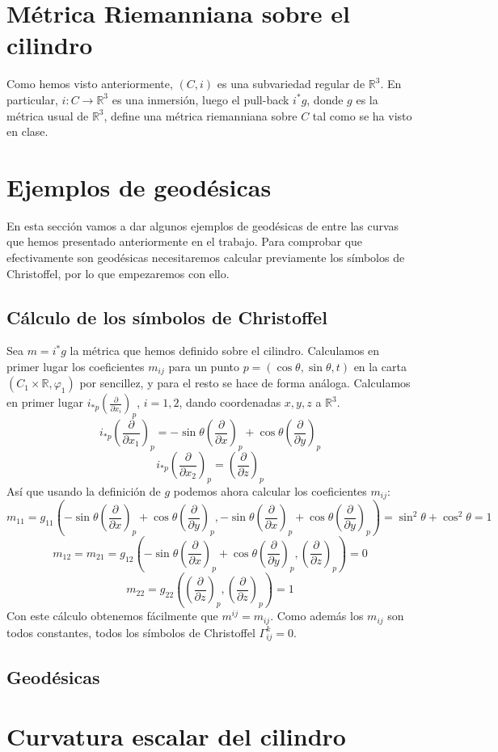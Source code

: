 \documentclass[twoside, 11pt]{article}
\theoremstyle{definition}
\newcommand{\R}{\mathbb{R}}
\newcommand{\parcial}[2]{\frac{\partial #1}{\partial #2}}
\begin{document}
\section{Métrica Riemanniana sobre el cilindro}

Como hemos visto anteriormente, $(C,i)$ es una subvariedad regular de $\R^3$. En particular, $i:C\to \R^3$ es una inmersión, luego el pull-back $i^*g$, donde $g$ es la métrica usual de $\R^3$, define una métrica riemanniana sobre $C$ tal como se ha visto en clase.


\section{Ejemplos de geodésicas}
En esta sección vamos a dar algunos ejemplos de geodésicas de entre las curvas que hemos presentado anteriormente en el trabajo. Para comprobar que efectivamente son geodésicas necesitaremos calcular previamente los símbolos de Christoffel, por lo que empezaremos con ello.

\subsection{Cálculo de los símbolos de Christoffel}
Sea $m=i^*g$ la métrica que hemos definido sobre el cilindro. Calculamos en primer lugar los coeficientes $m_{ij}$ para un punto $p=(\cos\theta,\sin\theta, t)$ en la carta $(C_1\times\R,\varphi_1)$ por sencillez, y para el resto se hace de forma análoga. Calculamos en primer lugar $i_{*p}\left(\parcial{}{x_i}\right)_p$, $i=1,2$, dando coordenadas $x,y,z$ a $\R^3$.
\[
i_{*p}\left(\parcial{}{x_1}\right)_p= -\sin\theta \left(\parcial{}{x}\right)_p+\cos\theta\left(\parcial{}{y}\right)_p
\]
\[
i_{*p}\left(\parcial{}{x_2}\right)_p= \left(\parcial{}{z}\right)_p
\]
Así que usando la definición de $g$ podemos ahora calcular los coeficientes $m_{ij}$:
\[
m_{11}=g_{11}\left(-\sin\theta \left(\parcial{}{x}\right)_p+\cos\theta\left(\parcial{}{y}\right)_p, -\sin\theta \left(\parcial{}{x}\right)_p+\cos\theta\left(\parcial{}{y}\right)_p\right)=\sin^2\theta+\cos^2\theta=1
\]
\[
m_{12}=m_{21}=g_{12}\left(-\sin\theta \left(\parcial{}{x}\right)_p+\cos\theta\left(\parcial{}{y}\right)_p, \left(\parcial{}{z}\right)_p\right)=0
\]
\[
m_{22}=g_{22}\left(\left(\parcial{}{z}\right)_p,\left(\parcial{}{z}\right)_p\right)=1
\]
Con este cálculo obtenemos fácilmente que $m^{ij}=m_{ij}$. Como además los $m_{ij}$ son todos constantes, todos los símbolos de Christoffel $\Gamma^k_{ij}=0$. 


\subsection{Geodésicas}


\section{Curvatura escalar del cilindro}
\end{document}
